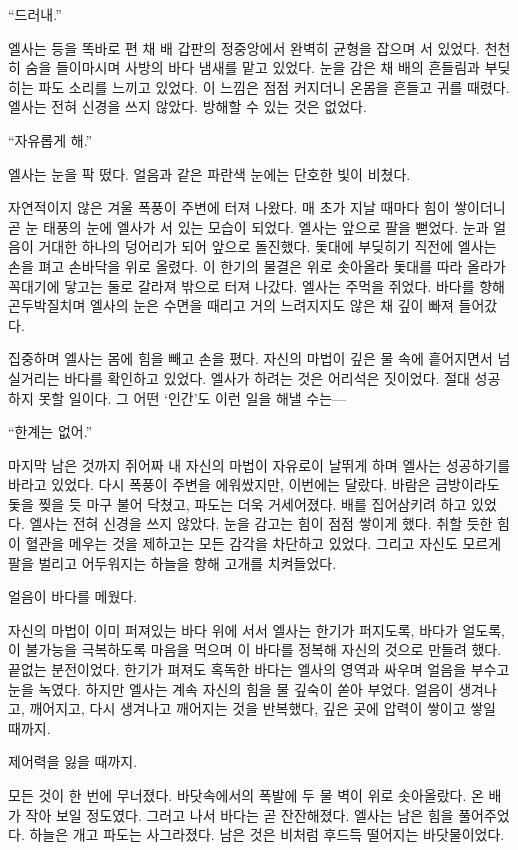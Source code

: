 \textbreak

``드러내.''

엘사는 등을 똑바로 편 채 배 갑판의 정중앙에서 완벽히 균형을 잡으며 서 있었다. 천천히 숨을 들이마시며 사방의 바다 냄새를 맡고 있었다. 눈을 감은 채 배의 흔들림과 부딪히는 파도 소리를 느끼고 있었다. 이 느낌은 점점 커지더니 온몸을 흔들고 귀를 때렸다. 엘사는 전혀 신경을 쓰지 않았다. 방해할 수 있는 것은 없었다.

``자유롭게 해.''

엘사는 눈을 팍 떴다. 얼음과 같은 파란색 눈에는 단호한 빛이 비쳤다.

자연적이지 않은 겨울 폭풍이 주변에 터져 나왔다. 매 초가 지날 때마다 힘이 쌓이더니 곧 눈 태풍의 눈에 엘사가 서 있는 모습이 되었다. 엘사는 앞으로 팔을 뻗었다. 눈과 얼음이 거대한 하나의 덩어리가 되어 앞으로 돌진했다. 돛대에 부딪히기 직전에 엘사는 손을 펴고 손바닥을 위로 올렸다. 이 한기의 물결은 위로 솟아올라 돛대를 따라 올라가 꼭대기에 닿고는 둘로 갈라져 밖으로 터져 나갔다. 엘사는 주먹을 쥐었다. 바다를 향해 곤두박질치며 엘사의 눈은 수면을 때리고 거의 느려지지도 않은 채 깊이 빠져 들어갔다.

집중하며 엘사는 몸에 힘을 빼고 손을 폈다. 자신의 마법이 깊은 물 속에 흩어지면서 넘실거리는 바다를 확인하고 있었다. 엘사가 하려는 것은 어리석은 짓이었다. 절대 성공하지 못할 일이다. 그 어떤 `인간'도 이런 일을 해낼 수는—

``한계는 없어.''

마지막 남은 것까지 쥐어짜 내 자신의 마법이 자유로이 날뛰게 하며 엘사는 성공하기를 바라고 있었다. 다시 폭풍이 주변을 에워쌌지만, 이번에는 달랐다. 바람은 금방이라도 돛을 찢을 듯 마구 불어 닥쳤고, 파도는 더욱 거세어졌다. 배를 집어삼키려 하고 있었다. 엘사는 전혀 신경을 쓰지 않았다. 눈을 감고는 힘이 점점 쌓이게 했다. 취할 듯한 힘이 혈관을 메우는 것을 제하고는 모든 감각을 차단하고 있었다. 그리고 자신도 모르게 팔을 벌리고 어두워지는 하늘을 향해 고개를 치켜들었다.

얼음이 바다를 메웠다.

자신의 마법이 이미 퍼져있는 바다 위에 서서 엘사는 한기가 퍼지도록, 바다가 얼도록, 이 불가능을 극복하도록 마음을 먹으며 이 바다를 정복해 자신의 것으로 만들려 했다. 끝없는 분전이었다. 한기가 펴져도 혹독한 바다는 엘사의 영역과 싸우며 얼음을 부수고 눈을 녹였다. 하지만 엘사는 계속 자신의 힘을 물 깊숙이 쏟아 부었다. 얼음이 생겨나고, 깨어지고, 다시 생겨나고 깨어지는 것을 반복했다, 깊은 곳에 압력이 쌓이고 쌓일 때까지.

제어력을 잃을 때까지.

모든 것이 한 번에 무너졌다. 바닷속에서의 폭발에 두 물 벽이 위로 솟아올랐다. 온 배가 작아 보일 정도였다. 그러고 나서 바다는 곧 잔잔해졌다. 엘사는 남은 힘을 풀어주었다. 하늘은 개고 파도는 사그라졌다. 남은 것은 비처럼 후드득 떨어지는 바닷물이었다.


